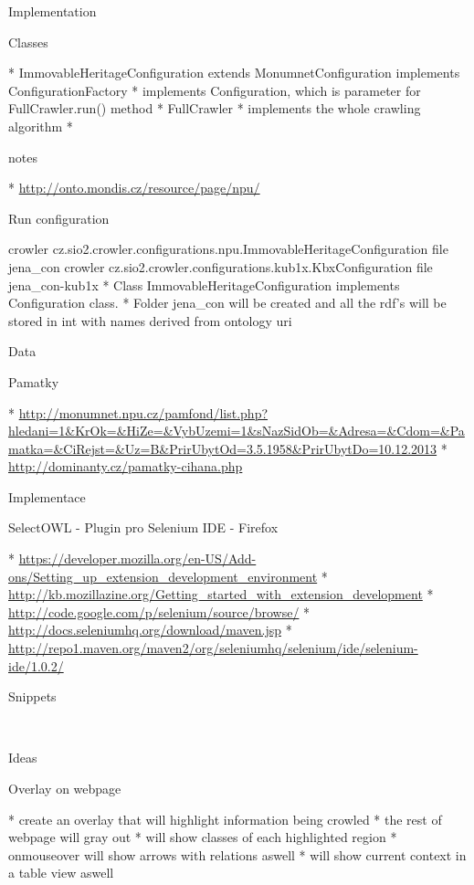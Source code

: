 \sec Implementation

\secc Classes

\begitems
  * ImmovableHeritageConfiguration extends MonumnetConfiguration implements ConfigurationFactory 
  \begitems
    * implements Configuration, which is parameter for FullCrawler.run() method
  \enditems
  * FullCrawler
  \begitems
    * implements the whole crawling algorithm
    * 
  \enditems
\enditems


\sec notes

\begitems
  * \url{http://onto.mondis.cz/resource/page/npu/}
\enditems

\secc Run configuration 

\begtt
crowler cz.sio2.crowler.configurations.npu.ImmovableHeritageConfiguration file jena_con
crowler cz.sio2.crowler.configurations.kub1x.KbxConfiguration file jena_con-kub1x
\endtt
\begitems
  * Class ImmovableHeritageConfiguration implements Configuration class. 
  * Folder jena\_con will be created and all the rdf's will be stored in int with names derived from ontology uri
\enditems


\chap Data

\sec Pamatky

\begitems
  * \url{http://monumnet.npu.cz/pamfond/list.php?hledani=1&KrOk=&HiZe=&VybUzemi=1&sNazSidOb=&Adresa=&Cdom=&Pamatka=&CiRejst=&Uz=B&PrirUbytOd=3.5.1958&PrirUbytDo=10.12.2013}
  * \url{http://dominanty.cz/pamatky-cihana.php}
\enditems


\chap Implementace

\sec SelectOWL - Plugin pro Selenium IDE - Firefox

\begitems
  * \url{https://developer.mozilla.org/en-US/Add-ons/Setting_up_extension_development_environment}
  * \url{http://kb.mozillazine.org/Getting_started_with_extension_development}
  * \url{http://code.google.com/p/selenium/source/browse/}
  * \url{http://docs.seleniumhq.org/download/maven.jsp}
  * \url{http://repo1.maven.org/maven2/org/seleniumhq/selenium/ide/selenium-ide/1.0.2/}
\enditems

\sec Snippets

~

\sec Ideas

\secc Overlay on webpage

\begitems
  * create an overlay that will highlight information being crowled
  * the rest of webpage will gray out
  * will show classes of each highlighted region
  * onmouseover will show arrows with relations aswell
  * will show current context in a table view aswell
\enditems



\bye
